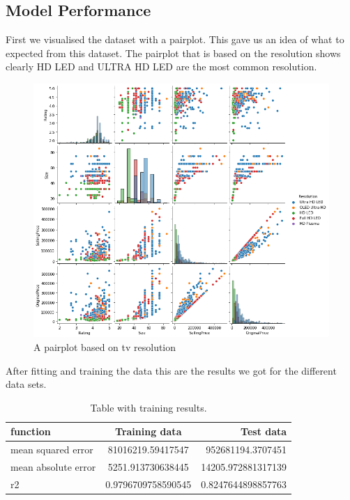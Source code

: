 \subsection{Model Performance}
First we visualised the dataset with a pairplot.
This gave us an idea of what to expected from this dataset.
The pairplot that is based on the resolution shows clearly HD LED and ULTRA HD LED are the most common resolution.
\begin{figure}
    \includegraphics[width=\linewidth]{images/pairplot_resolution.png}
    \caption{A pairplot based on tv resolution}
    \label{fig:pairplot resolution}
\end{figure}

After fitting and training the data this are the results we got for the different data sets.

\begin{table}[htp]
    \begin{center}
        \caption{Table with training results.}
        \label{tab:training results}
        \begin{tabular}{l|S|r} %
            \textbf{function} & \textbf{Training data} & \textbf{Test data} \\
            \hline
            mean squared error & 81016219.59417547 & 952681194.3707451 \\
            mean absolute error & 5251.913730638445 & 14205.972881317139 \\
            r2 & 0.9796709758590545 & 0.8247644898857763\\
        \end{tabular}
    \end{center}
\end{table}

